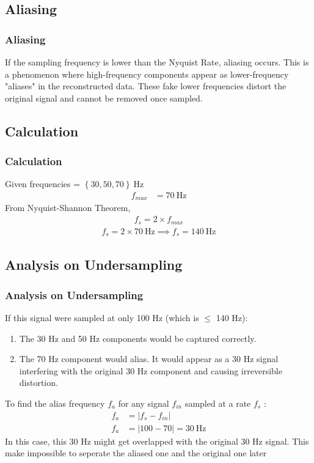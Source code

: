 \documentclass{beamer}
\providecommand{\cbrak}[1]{\ensuremath{\left\{#1\right\}}}
\theoremstyle{remark}
\numberwithin{equation}{section}
\begin{document}
\subsection{Aliasing}
\begin{frame}
\frametitle{Aliasing}
 If the sampling frequency is lower than the Nyquist Rate, aliasing occurs. This is a phenomenon where high-frequency components appear as lower-frequency "aliases" in the reconstructed data. These fake lower frequencies distort the original signal and cannot be removed once sampled.

 \end{frame}
 \subsection{Calculation}
\begin{frame}
\frametitle{Calculation}
Given frequencies = $\cbrak{30,50,70}\ \text{Hz}$ 
\begin{align}
    f_{max}& = 70\ \text{Hz}
\end{align}
From Nyquist-Shannon Theorem,
\begin{align}
   f_s =  2 \times f_{max}  
\end{align}
\begin{align}
    f_s =  2 \times 70\ \text{Hz} \implies f_{s} =  140\ \text{Hz}
\end{align}
 \end{frame}
\begin{frame}
\subsection{Analysis on Undersampling}
\frametitle{Analysis on Undersampling}
If this signal were sampled at only 100 Hz (which is $\leq$ 140 Hz):
\begin{enumerate}
    \item The 30 Hz and 50 Hz components would be captured correctly.
    \item The 70 Hz component would alias. It would appear as a 30 Hz signal  interfering with the original 30 Hz component and causing irreversible distortion.
\end{enumerate}
To find the alias frequency $f_a$ for any signal $f_{in}$ sampled at a rate $f_{s}$ :
\begin{align}
    f_a &= |f_s-f_{in}| \\
     f_a &= |100-70| =30\ \text{Hz}
    \end{align}
In this case, this 30 Hz might get overlapped with the original 30 Hz signal. This make impossible to seperate the aliased one and the original one later
\end{frame}
\end{document}
